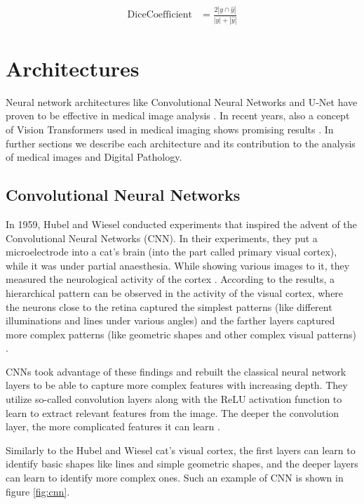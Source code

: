 \begin{align}
\label{eq:dice}
\text{DiceCoefficient} &= \frac{2|y \cap \hat{y}|}{|y| + |\hat{y}|}
\end{align}

\section{Architectures}
Neural network architectures like Convolutional Neural Networks \cite{LeCun2015-2} and U-Net \cite{Ronneberger2015} have proven to be effective in medical image analysis \cite{Santosh2022-2}. In recent years, also a concept of Vision Transformers \cite{Dosovitskiy2020, Hu2023} used in medical imaging shows promising results \cite{Shamshad2023, Hu2023, He2023}. In further sections we describe each architecture and its contribution to the analysis of medical images and Digital Pathology.

\subsection{Convolutional Neural Networks}
In 1959, Hubel and Wiesel conducted experiments that inspired the advent of the Convolutional Neural Networks (CNN). In their experiments, they put a microelectrode into a cat's brain (into the part called primary visual cortex), while it was under partial anaesthesia. While showing various images to it, they measured the neurological activity of the cortex \cite{Hubel1959}. According to the results, a hierarchical pattern can be observed in the activity of the visual cortex, where the neurons close to the retina captured the simplest patterns (like different illuminations and lines under various angles) and the farther layers  captured more complex patterns (like geometric shapes and other complex visual patterns) \cite{Hubel1959}. 

CNNs took advantage of these findings and rebuilt the classical neural network layers to be able to capture more complex features with increasing depth. They utilize so-called convolution layers along with the ReLU activation function to learn to extract relevant features from the image. The deeper the convolution layer, the more complicated features it can learn \cite{Santosh2022-2}. 

Similarly to the Hubel and Wiesel cat's visual cortex, the first layers can learn to identify basic shapes like lines and simple geometric shapes, and the deeper layers can learn to identify more complex ones. Such an example of CNN is shown in figure \ref{fig:cnn}.

